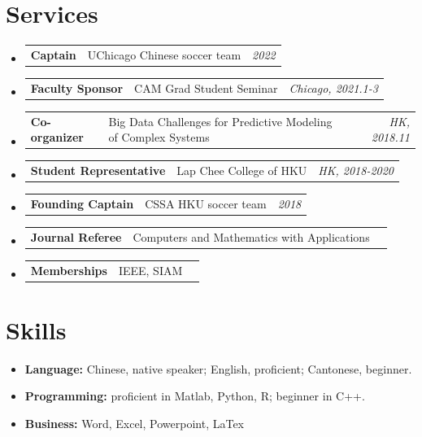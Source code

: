 \documentclass[a4paper,20pt]{article}
\makeatletter
\newcommand{\resumeItem}[2]{
	\item{
		\textbf{#1}{ #2 \vspace{-2pt}}
	}
}
\newcommand{\resumeSubItem}[3]{	\item{
		\begin{tabular*}{0.99\linewidth}{ll@{\extracolsep{\fill}}r}
			\textbf{#1} & #2 &  \textit{#3}
			\end{tabular*}\vspace{-5pt}
		}}
\newcommand{\resumeSubHeadingListStart}{\begin{itemize}[leftmargin=*]}
\newcommand{\resumeSubHeadingListEnd}{\end{itemize}}
\makeatother
\begin{document}
\section{Services}
\resumeSubHeadingListStart
\resumeSubItem{Captain }{UChicago Chinese soccer team}{2022}
\resumeSubItem{Faculty Sponsor }{CAM Grad Student Seminar}{Chicago, 2021.1-3}
\resumeSubItem{Co-organizer }{Big Data Challenges for Predictive Modeling of Complex Systems}{HK, 2018.11}
\resumeSubItem{Student Representative }{ Lap Chee College of HKU}{HK, 2018-2020}
\resumeSubItem{Founding Captain }{CSSA HKU soccer team}{2018}
\resumeSubItem{Journal Referee }{ Computers and Mathematics with Applications}{}
\resumeSubItem{Memberships }{IEEE, SIAM}{}
\resumeSubHeadingListEnd
	\section{Skills}
\resumeSubHeadingListStart
\resumeItem{Language: }{Chinese, native speaker; English, proficient; Cantonese, beginner.}
\resumeItem{Programming: }{proficient in Matlab, Python, R; beginner in C++.}
\resumeItem{Business: }{Word, Excel, Powerpoint, LaTex}
\resumeSubHeadingListEnd
\end{document}
